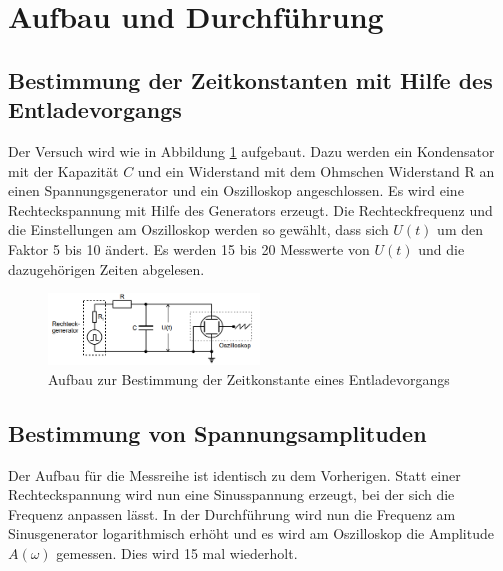 \section{Aufbau und Durchführung}
\label{sec:Durchführung}
\subsection{Bestimmung der Zeitkonstanten mit Hilfe des Entladevorgangs}
Der Versuch wird wie in Abbildung \ref{fig:aufbauent} aufgebaut. Dazu werden ein Kondensator mit der Kapazität $C$ und ein Widerstand mit dem
Ohmschen Widerstand R an einen Spannungsgenerator und ein Oszilloskop angeschlossen. Es wird eine Rechteckspannung mit Hilfe des Generators erzeugt.
Die Rechteckfrequenz und die Einstellungen am Oszilloskop werden so gewählt, dass sich $U(t)$ um den Faktor 5 bis 10 ändert.
Es werden 15 bis 20 Messwerte von $U(t)$ und die dazugehörigen Zeiten abgelesen.
\begin{figure} 
    \centering
    \caption{Aufbau zur Bestimmung der Zeitkonstante eines Entladevorgangs} 
    \label{fig:aufbauent}
    \includegraphics[width = 0.5\textwidth]{pics/aufbauent.png}
\end{figure}
\subsection{Bestimmung von Spannungsamplituden}
Der Aufbau für die Messreihe ist identisch zu dem Vorherigen. Statt einer Rechteckspannung wird nun eine Sinusspannung erzeugt, 
bei der sich die Frequenz anpassen lässt. In der Durchführung wird nun die Frequenz am Sinusgenerator logarithmisch erhöht und es wird am Oszilloskop die 
Amplitude $A(\omega)$ gemessen. Dies wird 15 mal wiederholt.
